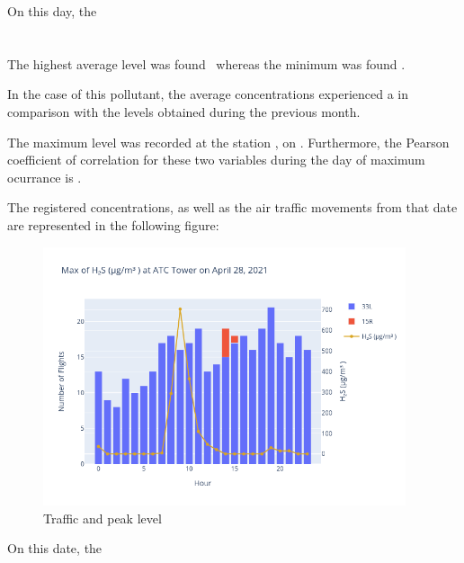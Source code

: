 \documentclass[12pt, oneside]{book}
\begin{document}
On this day, the \windPMten

\section{}



The highest average  level was found \maxDailyHtwoS\ whereas the minimum was found \minDailyHtwoS .


In the case of this pollutant, the average concentrations experienced a \monthChangeHtwoS in comparison with the levels obtained during the previous month.


The  maximum level was recorded at the station \stationMaxHtwoS, on \dayMaxHtwoS . 
Furthermore, the Pearson coefficient of correlation for these two variables during the day of maximum ocurrance is \correlHtwoS .

The registered concentrations, as well as the air traffic movements from that date are represented in the following figure:

{\begin{figure}[H]
\centering
\includegraphics[width=0.95\textwidth, keepaspectratio]{image17}
\caption{Traffic and  peak level}\label{image17}
\end{figure}}{}

On this date, the \windHtwoS
\end{document}
